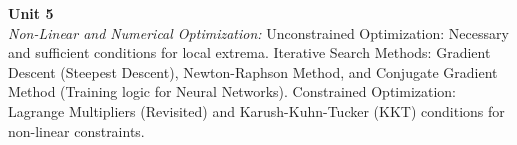 \vspace{0.3cm}

\noindent\textbf{Unit 5} \\
\textit{Non-Linear and Numerical Optimization:} Unconstrained Optimization: Necessary and sufficient conditions for local extrema. Iterative Search Methods: Gradient Descent (Steepest Descent), Newton-Raphson Method, and Conjugate Gradient Method (Training logic for Neural Networks). Constrained Optimization: Lagrange Multipliers (Revisited) and Karush-Kuhn-Tucker (KKT) conditions for non-linear constraints.

\newpage
{}